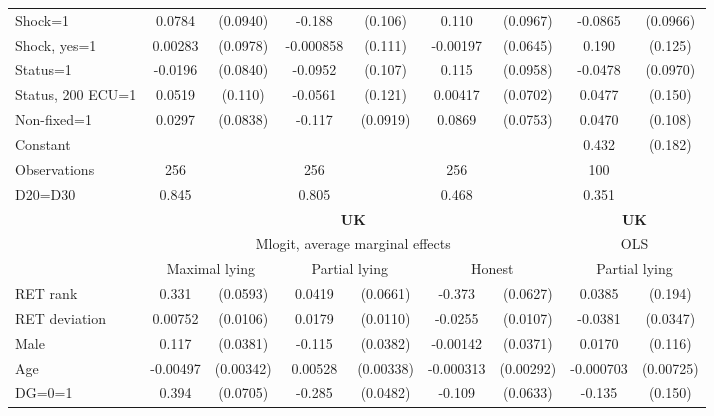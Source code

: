 \begin{tabular}{l|cccccc|cc}
Shock=1         &   0.0784         & (0.0940)&   -0.188\sym{*}  &  (0.106)&    0.110         & (0.0967)&  -0.0865         & (0.0966)\\
Shock, yes=1    &  0.00283         & (0.0978)&-0.000858         &  (0.111)& -0.00197         & (0.0645)&    0.190         &  (0.125)\\
Status=1        &  -0.0196         & (0.0840)&  -0.0952         &  (0.107)&    0.115         & (0.0958)&  -0.0478         & (0.0970)\\
Status, 200 ECU=1&   0.0519         &  (0.110)&  -0.0561         &  (0.121)&  0.00417         & (0.0702)&   0.0477         &  (0.150)\\
Non-fixed=1     &   0.0297         & (0.0838)&   -0.117         & (0.0919)&   0.0869         & (0.0753)&   0.0470         &  (0.108)\\
Constant        &                  &         &                  &         &                  &         &    0.432\sym{**} &  (0.182)\\
\hline
Observations    &      256         &         &      256         &         &      256         &         &      100         &         \\
D20=D30         &    0.845         &         &    0.805         &         &    0.468         &         &    0.351         &         \\
\hline\hline
&\multicolumn{6}{c|}{\bf UK}&\multicolumn{2}{c}{\bf UK}\\ &\multicolumn{6}{c|}{Mlogit, average marginal effects }&\multicolumn{2}{c}{OLS}\\
                &\multicolumn{2}{c}{Maximal lying}&\multicolumn{2}{c}{Partial lying}&\multicolumn{2}{c}{Honest}  &\multicolumn{2}{c}{Partial lying}\\
\hline
RET rank        &    0.331\sym{***}& (0.0593)&   0.0419         & (0.0661)&   -0.373\sym{***}& (0.0627)&   0.0385         &  (0.194)\\
RET deviation   &  0.00752         & (0.0106)&   0.0179         & (0.0110)&  -0.0255\sym{**} & (0.0107)&  -0.0381         & (0.0347)\\
Male            &    0.117\sym{***}& (0.0381)&   -0.115\sym{***}& (0.0382)& -0.00142         & (0.0371)&   0.0170         &  (0.116)\\
Age             & -0.00497         &(0.00342)&  0.00528         &(0.00338)&-0.000313         &(0.00292)&-0.000703         &(0.00725)\\
DG=0=1          &    0.394\sym{***}& (0.0705)&   -0.285\sym{***}& (0.0482)&   -0.109\sym{*}  & (0.0633)&   -0.135         &  (0.150)\\

\end{tabular}
